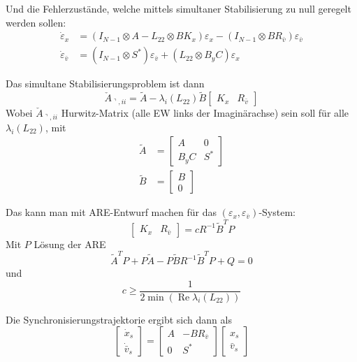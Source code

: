 Und die Fehlerzustände, welche mittels simultaner Stabilisierung
zu null geregelt werden sollen:
\begin{align}
    \dot{\varepsilon}_x &= (I_{N-1} \otimes A - L_{22} \otimes BK_x) \varepsilon_x - (I_{N-1} \otimes BR_{\bar{v}}) \varepsilon_{\bar{v}} \\
    \dot{\varepsilon}_{\bar{v}} &= (I_{N-1} \otimes S^*) \varepsilon_{\bar{v}} + (L_{22} \otimes B_y C) \varepsilon_x
\end{align}

Das simultane Stabilisierungsproblem ist dann
\begin{equation}
    \check{A}_{\urcorner, ii} = \tilde{A} - \lambda_i(L_{22}) \tilde{B} \begin{bmatrix}
        K_x & R_{\bar{v}}
    \end{bmatrix}
\end{equation}
Wobei $\check{A}_{\urcorner, ii}$ Hurwitz-Matrix (alle EW links der Imaginärachse)
sein soll für alle $\lambda_i(L_{22})$, mit
\begin{align}
    \tilde{A} &= \begin{bmatrix}
        A & 0 \\
        B_y C & S^*
    \end{bmatrix} \\
    \tilde{B} &= \begin{bmatrix}
        B \\ 0
    \end{bmatrix}
\end{align}

Das kann man mit ARE-Entwurf machen für das $(\varepsilon_x, \varepsilon_{\bar{v}})$-System:
\begin{equation}
    \boxed{
    \begin{bmatrix}
        K_x & R_{\bar{v}}
    \end{bmatrix}
    = cR^{-1}\tilde{B}^TP
    }
\end{equation}
Mit $P$ Lösung der ARE
\begin{equation}
    \tilde{A}^TP + P\tilde{A}-P\tilde{B}R^{-1}\tilde{B}^TP+Q = 0
\end{equation}
und
\begin{equation}
    c \geq \frac{1}{2 \min (\operatorname{Re} \lambda_i(L_{22}))}
\end{equation}


Die Synchronisierungstrajektorie ergibt sich dann als
\begin{equation}
    \begin{bmatrix}
        \dot{x}_s \\ \dot{\bar{v}}_s
    \end{bmatrix}
    =
    \begin{bmatrix}
        A & -BR_{\bar{v}} \\
        0 & S^*
    \end{bmatrix}
    \begin{bmatrix}
        x_s \\ \bar{v}_s
    \end{bmatrix}
\end{equation}

